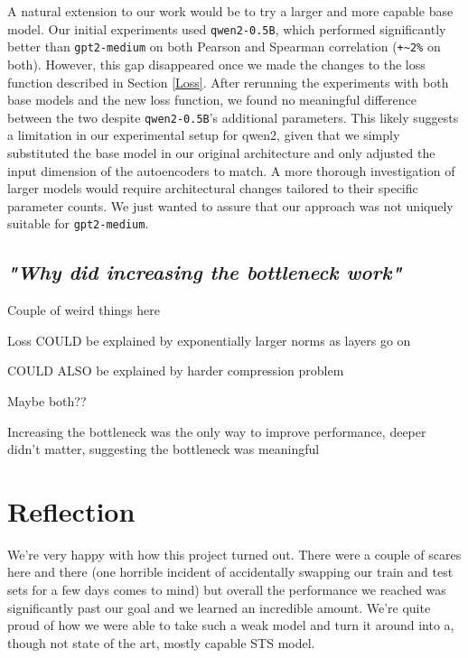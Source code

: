\documentclass{article}
\begin{document}
A natural extension to our work would be to try a larger and more capable base model. Our initial experiments used \verb|qwen2-0.5B|, which performed significantly better than \verb|gpt2-medium| on both Pearson and Spearman correlation (\verb|+~2%| on both). However, this gap disappeared once we made the changes to the loss function described in Section \ref{Loss}. After rerunning the experiments with both base models and the new loss function, we found no meaningful difference between the two despite \verb|qwen2-0.5B|'s additional parameters. This likely suggests a limitation in our experimental setup for qwen2, given that we simply substituted the base model in our original architecture and only adjusted the input dimension of the autoencoders to match. A more thorough investigation of larger models would require architectural changes tailored to their specific parameter counts. We just wanted to assure that our approach was not uniquely suitable for \verb|gpt2-medium|.

\subsection{\textit{"Why did increasing the bottleneck work"}}
Couple of weird things here

Loss COULD be explained by exponentially larger norms as layers go on

COULD ALSO be explained by harder compression problem

Maybe both??

Increasing the bottleneck was the only way to improve performance, deeper didn't matter, suggesting the bottleneck was meaningful

\section{Reflection}
We're very happy with how this project turned out. There were a couple of scares here and there (one horrible incident of accidentally swapping our train and test sets for a few days comes to mind) but overall the performance we reached was significantly past our goal and we learned an incredible amount. We're quite proud of how we were able to take such a weak model and turn it around into a, though not state of the art, mostly capable STS model.
\end{document}
